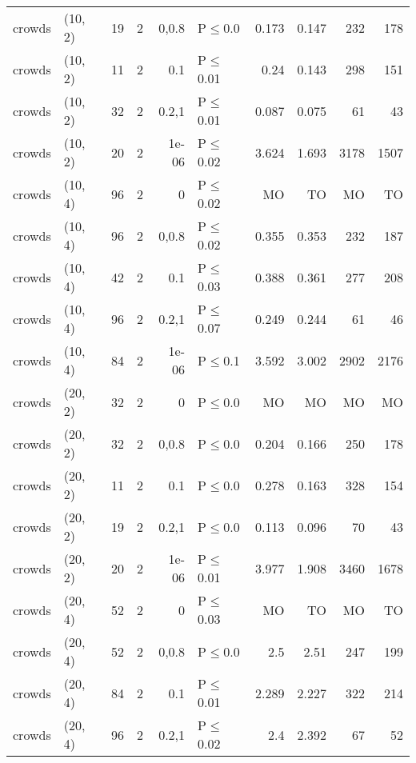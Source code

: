 \begin{longtable}{llrrrlrrrr}
 crowds        & (10, 2)  &     	19 &   2 & 0,0.8 & P$\leq$0.0   & 0.173   & 0.147    & 232    & 178    \\
 crowds        & (10, 2)  &     	11 &   2 & 0.1   & P$\leq$0.01  & 0.24    & 0.143    & 298    & 151    \\
 crowds        & (10, 2)  &     	32 &   2 & 0.2,1 & P$\leq$0.01  & 0.087   & 0.075    & 61     & 43     \\
 crowds        & (10, 2)  &     	20 &   2 & 1e-06 & P$\leq$0.02  & 3.624   & 1.693    & 3178   & 1507   \\
 crowds        & (10, 4)  &     	96 &   2 & 0     & P$\leq$0.02  & MO      & TO       & MO     & TO     \\
 crowds        & (10, 4)  &     	96 &   2 & 0,0.8 & P$\leq$0.02  & 0.355   & 0.353    & 232    & 187    \\
 crowds        & (10, 4)  &     	42 &   2 & 0.1   & P$\leq$0.03  & 0.388   & 0.361    & 277    & 208    \\
 crowds        & (10, 4)  &     	96 &   2 & 0.2,1 & P$\leq$0.07  & 0.249   & 0.244    & 61     & 46     \\
 crowds        & (10, 4)  &     	84 &   2 & 1e-06 & P$\leq$0.1   & 3.592   & 3.002    & 2902   & 2176   \\
 crowds        & (20, 2)  &     	32 &   2 & 0     & P$\leq$0.0   & MO      & MO       & MO     & MO     \\
 crowds        & (20, 2)  &     	32 &   2 & 0,0.8 & P$\leq$0.0   & 0.204   & 0.166    & 250    & 178    \\
 crowds        & (20, 2)  &     	11 &   2 & 0.1   & P$\leq$0.0   & 0.278   & 0.163    & 328    & 154    \\
 crowds        & (20, 2)  &     	19 &   2 & 0.2,1 & P$\leq$0.0   & 0.113   & 0.096    & 70     & 43     \\
 crowds        & (20, 2)  &     	20 &   2 & 1e-06 & P$\leq$0.01  & 3.977   & 1.908    & 3460   & 1678   \\
 crowds        & (20, 4)  &     	52 &   2 & 0     & P$\leq$0.03  & MO      & TO       & MO     & TO     \\
 crowds        & (20, 4)  &     	52 &   2 & 0,0.8 & P$\leq$0.0   & 2.5     & 2.51     & 247    & 199    \\
 crowds        & (20, 4)  &     	84 &   2 & 0.1   & P$\leq$0.01  & 2.289   & 2.227    & 322    & 214    \\
 crowds        & (20, 4)  &     	96 &   2 & 0.2,1 & P$\leq$0.02  & 2.4     & 2.392    & 67     & 52     \\

\end{longtable}

